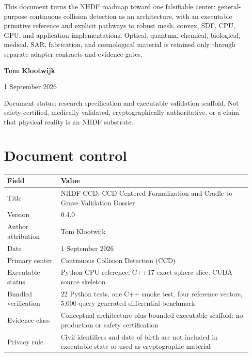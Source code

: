 \documentclass[11pt,a4paper,openany]{book}
\begin{document}
\begin{titlepage}
\vfill
\begin{decisionbox}
This document turns the NHDF roadmap toward one falsifiable center: general-purpose continuous collision detection as an architecture, with an executable primitive reference and explicit pathways to robust mesh, convex, SDF, CPU, GPU, and application implementations. Optical, quantum, chemical, biological, medical, SAR, fabrication, and cosmological material is retained only through separate adapter contracts and evidence gates.
\end{decisionbox}
\vspace{8mm}
{\Large\bfseries Tom Klootwijk\par}
{\large 1 September 2026\par}
\vspace{4mm}
{\small Document status: research specification and executable validation scaffold. Not safety-certified, medically validated, cryptographically authoritative, or a claim that physical reality is an NHDF substrate.}
\end{titlepage}
\hypersetup{pageanchor=true}

\frontmatter
\chapter*{Document control}
\begin{tabularx}{\textwidth}{@{}L{0.24\textwidth}Y@{}}
\toprule
Field & Value \\
\midrule
Title & NHDF-CCD: CCD-Centered Formalization and Cradle-to-Grave Validation Dossier \\
Version & 0.4.0 \\
Author attribution & Tom Klootwijk \\
Date & 1 September 2026 \\
Primary center & Continuous Collision Detection (CCD) \\
Executable status & Python CPU reference; C++17 exact-sphere slice; CUDA source skeleton \\
Bundled verification & 22 Python tests, one C++ smoke test, four reference vectors, 5,000-query generated differential benchmark \\
Evidence class & Conceptual architecture plus bounded executable scaffold; no production or safety certification \\
Privacy rule & Civil identifiers and date of birth are not included in executable state or used as cryptographic material \\
\bottomrule
\end{tabularx}
\end{document}
